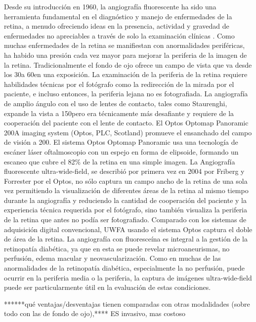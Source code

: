 Desde su introducción en 1960, la angiografía fluorescente ha sido una herramienta fundamental en el diagnóstico y manejo de enfermedades de la retina, a menudo ofreciendo ideas en la presencia, actividad y gravedad de enfermedades no apreciables a través de solo la examinación clínicas . Como muchas enfermedades de la retina se manifiestan con anormalidades periféricas, ha habido una presión cada vez mayor para mejorar la periferia de la imagen de la retina. Tradicionalmente el fondo de ojo ofrece un campo de vista que va desde los 30\degree a 60\degree en una exposición. La examinación de la periferia de la retina requiere habilidades técnicas   por el fotógrafo como la redirección de la mirada por el paciente, e incluso entonces, la periferia lejana no es fotografiada. 
La angiografía de amplio ángulo con el uso de lentes de contacto, tales como  Staurenghi, expande la vista a 150\degree pero era técnicamente más desafiante y requiere de la cooperación del paciente con el lente de contacto. El Optos Optomap Panoramic
200A imaging system (Optos, PLC, Scotland) promueve el ensanchado del campo de visión a 200\degree. El sistema  Optos Optomap Panoramic usa una tecnología de escáner láser oftalmoscopio con un espejo en forma de elipsoide, formando un escaneo que cubre el 82\% de la retina en  una simple imagen. 
La Angiografía  fluorescente ultra-wide-field, se describió por primera vez en 2004 por Friberg y Forrester por el Optos, no sólo captura un campo ancho de la retina de una sola vez  permitiendo la visualización de diferentes áreas de la retina  al mismo  tiempo durante 
la angiografía y reduciendo la cantidad de cooperación del paciente y la experiencia técnica requerida por el fotógrafo, sino también visualiza la periferia de la retina que antes no podía ser fotografiado. Comparado con los sistemas de adquisición digital convencional, UWFA usando el sistema Optos  captura el doble de área de la retina. 
La angiografía con fluoresceína es integral a la gestión de la retinopatía diabética, ya que en esta se puede revelar microaneurismas, no perfusión, edema macular y neovascularización. Como en muchas de las anormalidades de la retinopatía diabética, especialmente la no perfusión, puede ocurrir en la periferia media o la periferia, la captura de imágenes ultra-wide-field puede ser particularmente útil en la evaluación de estas condiciones.\cite{patel2014ultra} 

******qué ventajas/desventajas tienen comparadas con otras modalidades (sobre todo con las de fondo de ojo),****
ES invasivo, mas costoso


